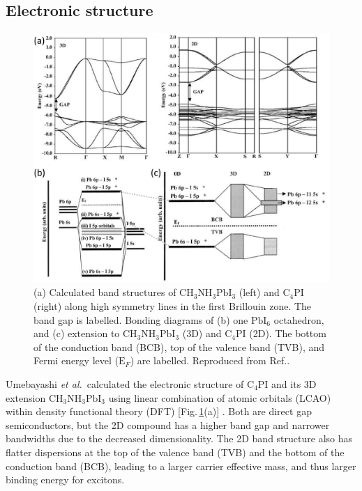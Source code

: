 \subsection{Electronic structure}
\begin{figure}[h!]
\centering
\includegraphics[width=\textwidth]{Fig12}
\caption{(a) Calculated band structures of $\textrm{CH}_3\textrm{NH}_3\textrm{PbI}_3$ (left) and $\textrm{C}_{4}$PI (right) along high symmetry lines in the first Brillouin zone. The band gap is labelled. Bonding diagrams of (b) one $\textrm{PbI}_6$ octahedron, and (c) extension to $\textrm{CH}_3\textrm{NH}_3\textrm{PbI}_3$ (3D) and $\textrm{C}_{4}$PI (2D). The bottom of the conduction band (BCB), top of the valence band (TVB), and Fermi energy level ($\textrm{E}_F$) are labelled. Reproduced from Ref.\!.}
\label{2Fig12}
\end{figure}
Umebayashi \textit{et al.}\ calculated the electronic structure of $\textrm{C}_{4}$PI and its 3D extension $\textrm{CH}_3\textrm{NH}_3\textrm{PbI}_3$ using linear combination of atomic orbitals (LCAO) within density functional theory (DFT) [Fig.\,\ref{2Fig12}(a)] \cite{Umebayashi2003}. Both are direct gap semiconductors, but the 2D compound has a higher band gap and narrower bandwidths due to the decreased dimensionality. The 2D band structure also has flatter dispersions at the top of the valence band (TVB) and the bottom of the conduction band (BCB), leading to a larger carrier effective mass, and thus larger binding energy for excitons. 

